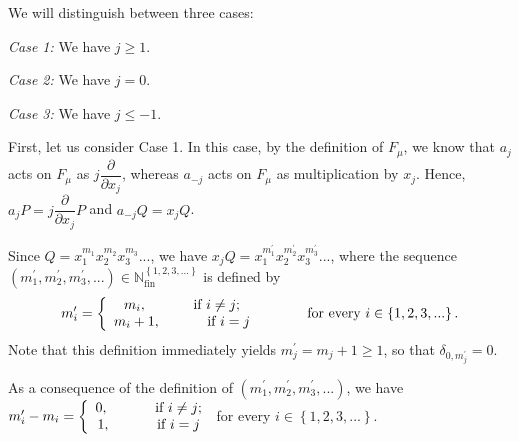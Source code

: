 \documentclass[etingof-lie.tex]{subfiles}
\begin{document}
We will distinguish between three cases:

\textit{Case 1:} We have $j\geq1$.

\textit{Case 2:} We have $j=0$.

\textit{Case 3:} We have $j\leq-1$.

First, let us consider Case 1. In this case, by the definition of $F_{\mu}$,
we know that $a_{j}$ acts on $F_{\mu}$ as $j\dfrac{\partial}{\partial x_{j}}$,
whereas $a_{-j}$ acts on $F_{\mu}$ as multiplication by $x_{j}$. Hence,
$a_{j}P=j\dfrac{\partial}{\partial x_{j}}P$ and $a_{-j}Q=x_{j}Q$.

Since $Q=x_{1}^{m_{1}}x_{2}^{m_{2}}x_{3}^{m_{3}}...$, we have $x_{j}%
Q=x_{1}^{m_{1}^{\prime}}x_{2}^{m_{2}^{\prime}}x_{3}^{m_{3}^{\prime}}...$,
where the sequence $\left(  m_{1}^{\prime},m_{2}^{\prime},m_{3}^{\prime
},...\right)  \in\mathbb{N}_{\operatorname*{fin}}^{\left\{  1,2,3,...\right\}
}$ is defined by%
\[
m_{i}^{\prime}=\left\{
\begin{array}
[c]{c}%
m_{i},\ \ \ \ \ \ \ \ \ \ \text{if }i\neq j;\\
m_{i}+1,\ \ \ \ \ \ \ \ \ \ \text{if }i=j
\end{array}
\right.  \ \ \ \ \ \ \ \ \ \ \text{for every }i\in\left\{  1,2,3,...\right\}
.
\]
Note that this definition immediately yields $m_{j}^{\prime}=m_{j}+1\geq1$, so
that $\delta_{0,m_{j}^{\prime}}=0$.

As a consequence of the definition of $\left(  m_{1}^{\prime},m_{2}^{\prime
},m_{3}^{\prime},...\right)  $, we have $m_{i}^{\prime}-m_{i}=\left\{
\begin{array}
[c]{c}%
0,\ \ \ \ \ \ \ \ \ \ \text{if }i\neq j;\\
1,\ \ \ \ \ \ \ \ \ \ \text{if }i=j
\end{array}
\right.  $ for every $i\in\left\{  1,2,3,...\right\}  $.
\end{document}
